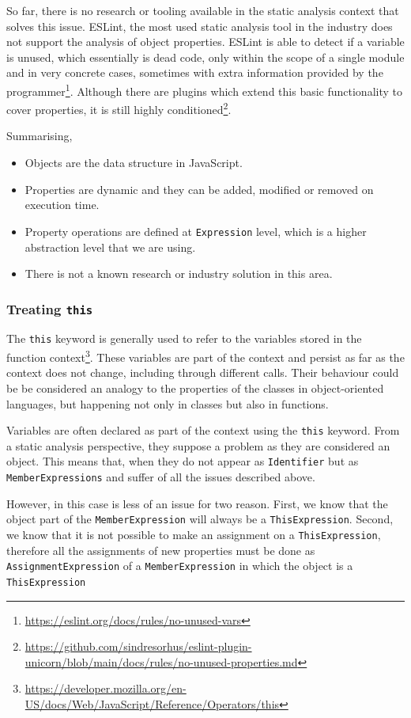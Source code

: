 \documentclass{uvamscse}
\begin{document}
So far, there is no research or tooling available in the static analysis context that solves this issue. ESLint, the most used static analysis tool in the industry does not support the analysis of object properties. ESLint is able to detect if a variable is unused, which essentially is dead code, only within the scope of a single module and in very concrete cases, sometimes with extra information provided by the programmer\footnote{\url{https://eslint.org/docs/rules/no-unused-vars}}. Although there are plugins which extend this basic functionality to cover properties, it is still highly conditioned\footnote{\url{https://github.com/sindresorhus/eslint-plugin-unicorn/blob/main/docs/rules/no-unused-properties.md}}.

Summarising,

\begin{itemize}
    \item Objects are the data structure in JavaScript.
    \item Properties are dynamic and they can be added, modified or removed on execution time.
    \item Property operations are defined at \texttt{Expression} level, which is a higher abstraction level that we are using.
    \item There is not a known research or industry solution in this area.
\end{itemize}

\subsubsection{Treating \texttt{this}}
The \texttt{this} keyword is generally used to refer to the variables stored in the function context\footnote{\url{https://developer.mozilla.org/en-US/docs/Web/JavaScript/Reference/Operators/this}}. These variables are part of the context and persist as far as the context does not change, including through different calls. Their behaviour could be be considered an analogy to the properties of the classes in object-oriented languages, but happening not only in classes but also in functions.

Variables are often declared as part of the context using the \texttt{this} keyword. From a static analysis perspective, they suppose a problem as they are considered an object. This means that, when they do not appear as \texttt{Identifier} but as \texttt{MemberExpressions} and suffer of all the issues described above.

However, in this case is less of an issue for two reason. First, we know that the object part of the \texttt{MemberExpression} will always be a \texttt{ThisExpression}. Second, we know that it is not possible to make an assignment on a \texttt{ThisExpression}, therefore all the assignments of new properties must be done as \texttt{AssignmentExpression} of a \texttt{MemberExpression} in which the object is a \texttt{ThisExpression}
\end{document}
